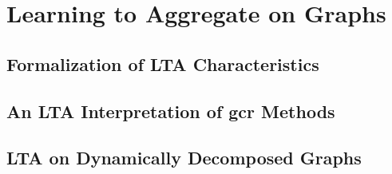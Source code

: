 \chapter{Learning to Aggregate on Graphs}%
\label{sec:ltag}

\section{Formalization of LTA Characteristics}%
\label{sec:ltag:formal}

\section{An LTA Interpretation of \acs{gcr} Methods}%
\label{sec:ltag:interpretation}

\section{LTA on Dynamically Decomposed Graphs}%
\label{sec:ltag:dyndecomp}
